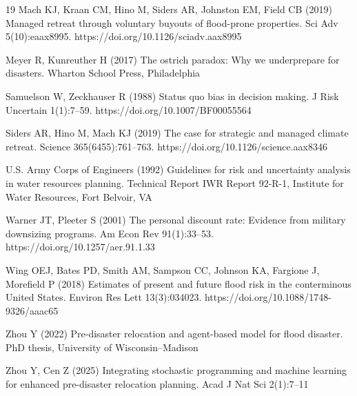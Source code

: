 \documentclass[12pt,a4paper]{article}
\begin{document}
\begin{thebibliography}{19}
Mach KJ, Kraan CM, Hino M, Siders AR, Johnston EM, Field CB (2019) Managed retreat through voluntary buyouts of flood-prone properties. Sci Adv 5(10):eaax8995. https://doi.org/10.1126/sciadv.aax8995

Meyer R, Kunreuther H (2017) The ostrich paradox: Why we underprepare for disasters. Wharton School Press, Philadelphia

Samuelson W, Zeckhauser R (1988) Status quo bias in decision making. J Risk Uncertain 1(1):7--59. https://doi.org/10.1007/BF00055564

Siders AR, Hino M, Mach KJ (2019) The case for strategic and managed climate retreat. Science 365(6455):761--763. https://doi.org/10.1126/science.aax8346

U.S. Army Corps of Engineers (1992) Guidelines for risk and uncertainty analysis in water resources planning. Technical Report IWR Report 92-R-1, Institute for Water Resources, Fort Belvoir, VA

Warner JT, Pleeter S (2001) The personal discount rate: Evidence from military downsizing programs. Am Econ Rev 91(1):33--53. https://doi.org/10.1257/aer.91.1.33

Wing OEJ, Bates PD, Smith AM, Sampson CC, Johnson KA, Fargione J, Morefield P (2018) Estimates of present and future flood risk in the conterminous United States. Environ Res Lett 13(3):034023. https://doi.org/10.1088/1748-9326/aaac65

Zhou Y (2022) Pre-disaster relocation and agent-based model for flood disaster. PhD thesis, University of Wisconsin--Madison

Zhou Y, Cen Z (2025) Integrating stochastic programming and machine learning for enhanced pre-disaster relocation planning. Acad J Nat Sci 2(1):7--11

\end{thebibliography}

\end{document}
